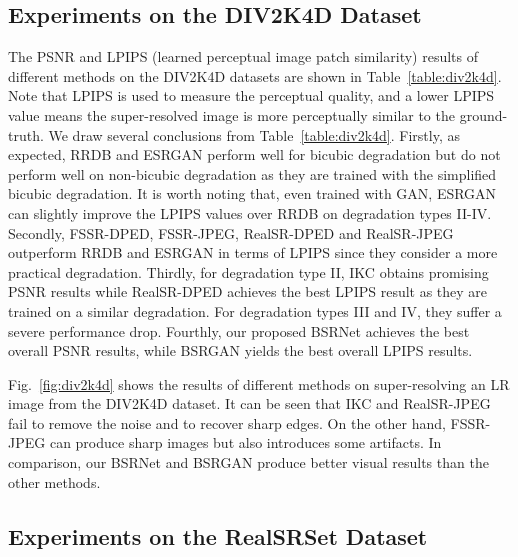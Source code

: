 \documentclass[10pt,twocolumn,letterpaper]{article}
\begin{document}
\subsection{Experiments on the DIV2K4D Dataset}

The PSNR and LPIPS (learned perceptual image patch similarity) results of different methods on the DIV2K4D datasets are shown in Table~\ref{table:div2k4d}. Note that LPIPS is used to measure the perceptual quality, and a lower LPIPS value means the super-resolved image is more perceptually similar to the ground-truth. We draw several conclusions from Table~\ref{table:div2k4d}. Firstly, as expected, RRDB and ESRGAN perform well for bicubic degradation but do not perform well on non-bicubic degradation as they are trained with the simplified bicubic degradation. It is worth noting that, even trained with GAN, ESRGAN can slightly improve the LPIPS values over RRDB on degradation types II-IV. Secondly, FSSR-DPED, FSSR-JPEG, RealSR-DPED and RealSR-JPEG outperform RRDB and ESRGAN in terms of LPIPS since they consider a more practical degradation. Thirdly, for degradation type II, IKC obtains promising PSNR results while RealSR-DPED achieves the best LPIPS result as they are trained on a similar degradation. For degradation types III and IV, they suffer a severe performance drop.
Fourthly, our proposed BSRNet achieves the best overall PSNR results, while BSRGAN yields the best overall LPIPS results.


Fig.~\ref{fig:div2k4d} shows the results of different methods on super-resolving an LR image from the DIV2K4D dataset. It can be seen that IKC and RealSR-JPEG fail to remove the noise and to recover sharp edges. On the other hand, FSSR-JPEG can produce sharp images but also introduces some artifacts. In comparison, our BSRNet and BSRGAN produce better visual results than the other methods.



\subsection{Experiments on the RealSRSet Dataset}
\end{document}
